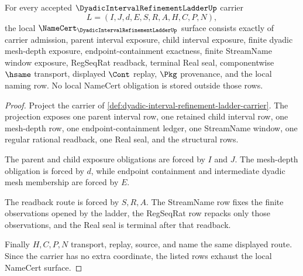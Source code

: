 \begin{theorem}
\label{thm:dyadic-interval-refinement-ladder-namecert-obligations}
For every accepted $\DyadicIntervalRefinementLadderUp$ carrier
$$
L=(I,J,d,E,S,R,A,H,C,P,N),
$$
the local $\NameCert_{\DyadicIntervalRefinementLadderUp}$ surface consists exactly of carrier admission, parent interval exposure, child interval exposure, finite dyadic mesh-depth exposure, endpoint-containment exactness, finite StreamName window exposure, RegSeqRat readback, terminal Real seal, componentwise $\hsame$ transport, displayed $\Cont$ replay, $\Pkg$ provenance, and the local naming row. No local NameCert obligation is stored outside those rows.
\end{theorem}
\begin{proof}
Project the carrier of \autoref{def:dyadic-interval-refinement-ladder-carrier}. The projection exposes one parent interval row, one retained child interval row, one mesh-depth row, one endpoint-containment ledger, one StreamName window, one regular rational readback, one Real seal, and the structural rows.

The parent and child exposure obligations are forced by $I$ and $J$. The mesh-depth obligation is forced by $d$, while endpoint containment and intermediate dyadic mesh membership are forced by $E$.

The readback route is forced by $S,R,A$. The StreamName row fixes the finite observations opened by the ladder, the RegSeqRat row repacks only those observations, and the Real seal is terminal after that readback.

Finally $H,C,P,N$ transport, replay, source, and name the same displayed route. Since the carrier has no extra coordinate, the listed rows exhaust the local NameCert surface.
\end{proof}

